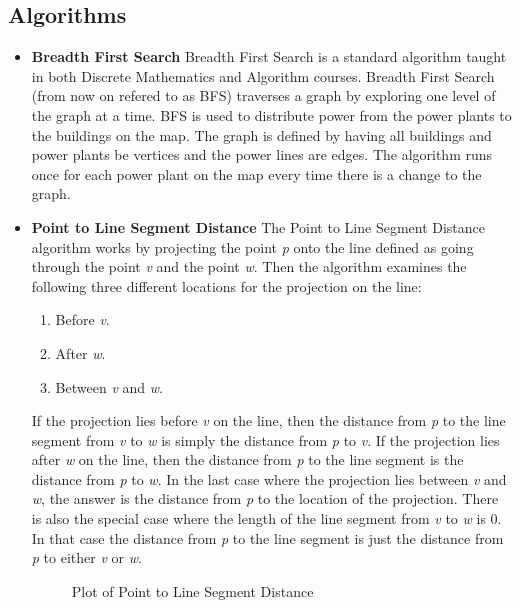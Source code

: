 	\subsection*{Algorithms}
		\begin{itemize}
			\item{\bf Breadth First Search}
			Breadth First Search is a standard algorithm taught in both Discrete Mathematics and 
			Algorithm courses. Breadth First Search (from now on refered to as BFS) traverses a graph 
			by exploring one level of the graph at a time. BFS is used to distribute power from the 
			power plants to the buildings on the map. The graph is defined by having all buildings 
			and power plants be vertices and the power lines are edges. The algorithm runs once for 
			each power plant on the map every time there is a change to the graph.

			\item {\bf Point to Line Segment Distance}
			The Point to Line Segment Distance algorithm works by projecting the point \emph{p} onto the line 
			defined as going through the point \emph{v} and the point \emph{w}. Then the algorithm 
			examines the following three different locations for the projection on the line: 
			\begin{enumerate}
				\item Before \emph{v}.
				\item After \emph{w}.
				\item Between \emph{v} and \emph{w}.
			\end{enumerate}
			If the projection lies before \emph{v} on the line, then the distance from \emph{p} to 
			the line segment from \emph{v} to \emph{w} is simply the distance from \emph{p} to 
			\emph{v}. If the projection lies after \emph{w} on the line, then the distance from 
			\emph{p} to the line segment is the distance from \emph{p} to \emph{w}. In the last case 
			where the projection lies between \emph{v} and \emph{w}, the answer is the distance from 
			\emph{p} to the location of the projection. There is also the special case where the 
			length of the line segment from \emph{v} to \emph{w} is 0. In that case the distance 
			from \emph{p} to the line segment is just the distance from \emph{p} to either \emph{v} 
			or \emph{w}.\cite{pldTheory}\cite{pldCode}

			\begin{figure}[H]
			\centering
			\caption{Plot of Point to Line Segment Distance}
			\end{figure}
		\end{itemize}


